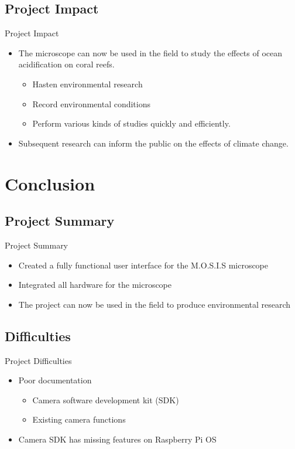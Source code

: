 \documentclass[17pt, aspectratio=169]{beamer}
\begin{document}
\subsection*{Project Impact}
\begin{frame}{Project Impact}
	\begin{itemize}
		\item The microscope can now be used in the field to study the effects of ocean acidification on coral reefs.
		      \begin{itemize}
			      \item Hasten environmental research
			      \item Record environmental conditions
			      \item Perform various kinds of studies quickly and efficiently.
		      \end{itemize}
		\item Subsequent research can inform the public on the effects of climate change.
	\end{itemize}
\end{frame}
\section{Conclusion}
\subsection{Project Summary}
\begin{frame}{Project Summary}
	\begin{itemize}
		\item Created a fully functional user interface for the M.O.S.I.S microscope
		\item Integrated all hardware for the microscope
		\item The project can now be used in the field to produce environmental research
	\end{itemize}
\end{frame}
\subsection{Difficulties}
\begin{frame}{Project Difficulties}
	\begin{itemize}
		\item Poor documentation
		      \begin{itemize}
			      \item Camera software development kit (SDK)
			      \item Existing camera functions
		      \end{itemize}
		\item Camera SDK has missing features on Raspberry Pi OS
	\end{itemize}
\end{frame}
\end{document}
